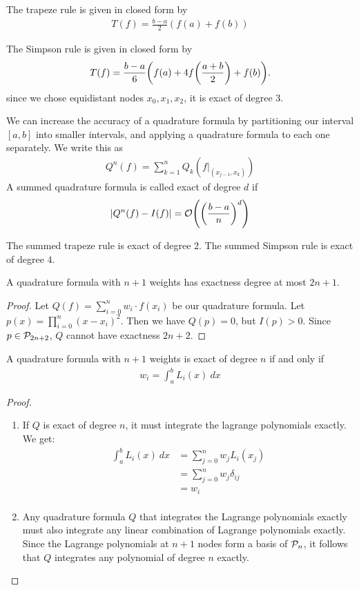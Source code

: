 \begin{theorem}
	The trapeze rule is given in closed form by
	\begin{align*}
		T(f) = \frac{b-a}{2}(f(a) + f(b))
	\end{align*}
\end{theorem}
\begin{theorem}
	The Simpson rule is given in closed form by
	\begin{align*}
		T(f) = \frac{b-a}{6}\qty(f(a) + 4f\qty(\frac{a+b}{2})+ f(b)).
	\end{align*}
	since we chose equidistant nodes $x_0, x_1, x_2$, it is exact of degree $3$.
\end{theorem}
\newpar
We can increase the accuracy of a quadrature formula by partitioning our interval $[a,b]$ into smaller intervals, and applying a quadrature formula to each one separately. We write this as
\begin{align*}
	Q^n(f) = \sum_{k = 1}^n Q_k(f|_{(x_{j-1},x_k)})
\end{align*}
A summed quadrature formula is called exact of degree $d$ if
\begin{align*}
	\abs{Q^n(f) - I(f)} = \mathcal{O}\qty(\qty(\frac{b-a}{n})^d)
\end{align*}
\begin{proposition}
	The summed trapeze rule is exact of degree $2$. The summed Simpson rule is exact of degree $4$.
\end{proposition}
\begin{lemma}
	A quadrature formula with $n+1$ weights has exactness degree at most $2n + 1$.
\end{lemma}
\begin{proof}
	Let $Q(f) = \sum_{i = 0}^n w_i \cdot f(x_i)$ be our quadrature formula. Let $p(x) = \prod_{i = 0}^n (x - x_i)^2$. Then we have $Q(p) = 0$, but $I(p) > 0$. Since $p \in \mathcal{P}_{2n + 2}$, $Q$ cannot have exactness $2n + 2$.
\end{proof}
\begin{lemma}
	A quadrature formula with $n+1$ weights is exact of degree $n$ if and only if
	\begin{align*}
		w_i = \int_a^b L_i(x) ~dx
	\end{align*}
\end{lemma}
\begin{proof}
	\begin{enumerate}
		\item If $Q$ is exact of degree $n$, it must integrate the lagrange polynomials exactly. We get:
		\begin{align*}
			\int_a^b L_i(x) ~dx 
			&= \sum_{j = 0}^n w_j L_i(x_j)\\ 
			&= \sum_{j = 0}^n w_j \delta_{ij}\\ 
			&= w_i\\ 
		\end{align*}
		\item Any quadrature formula $Q$ that integrates the Lagrange polynomials exactly must also integrate any linear combination of Lagrange polynomials exactly. Since the Lagrange polynomials at $n+1$ nodes form a basis of $\mathcal{P}_n$, it follows that $Q$ integrates any polynomial of degree $n$ exactly.
	\end{enumerate}
\end{proof}
